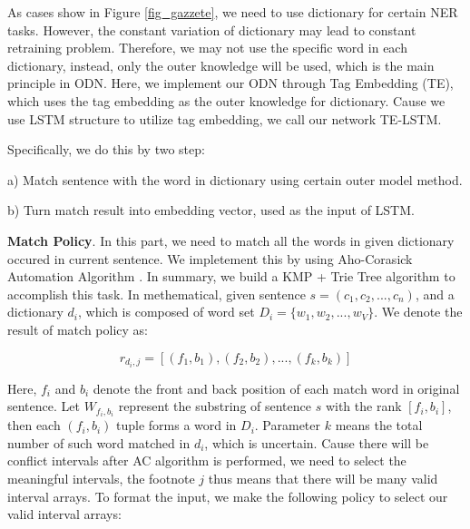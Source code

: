 \documentclass[letterpaper]{article} %
\begin{document}
As cases show in Figure \ref{fig_gazzete}, we need to use dictionary for certain NER tasks. However, the constant variation of dictionary may lead to constant retraining problem. Therefore, we may not use the specific word in each dictionary, instead, only the outer knowledge will be used, which is the main principle in ODN. Here, we implement our ODN through Tag Embedding (TE), which uses the tag embedding as the outer knowledge for dictionary. Cause we use LSTM structure to utilize tag embedding, we call our network TE-LSTM.

Specifically, we do this by two step: 

a)  Match sentence with the word in dictionary using certain outer model method.

b)  Turn match result into embedding vector, used as the input of LSTM.



\textbf{Match Policy}. In this part, we need to match all the words in given dictionary occured in current sentence. We impletement this by using Aho-Corasick Automation Algorithm \cite{acalg}. In summary, we build a KMP \cite{kmp} + Trie Tree \cite{trietree} algorithm to accomplish this task. In methematical, given sentence $s = (c_1, c_2, ..., c_n) $, and a dictionary $d_i$, which is composed of word set $D_i=\{w_1, w_2, ..., w_V\}$. We denote the result of match policy as:

\begin{equation}
r_{d_i, j} = [ (f_1, b_1), (f_2 , b_2), ..., (f_k, b_k) ] \label{match_result}
\end{equation}



Here, $f_i$ and $b_i$ denote the front and back position of each match word in original sentence. Let $W_{f_i,b_i}$ represent the substring of sentence $s$ with the rank $[f_i, b_i]$, then each $(f_i, b_i)$ tuple forms a word in $D_i$. Parameter $k$ means the total number of such word matched in $d_i$, which is uncertain. Cause there will be conflict intervals after AC algorithm is performed, we need to select the meaningful intervals, the footnote $j$ thus means that there will be many valid interval arrays. To format the input, we make the following policy to select our valid interval arrays:
\end{document}
